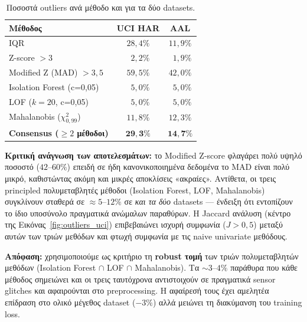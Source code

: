 \begin{table}[H]
    \centering
    \caption{Ποσοστά outliers ανά μέθοδο και για τα δύο datasets.}
    \label{tab:outlier_rates}
    \begin{tabular}{lcc}
        \toprule
        \textbf{Μέθοδος} & \textbf{UCI HAR} & \textbf{AAL} \\
        \midrule
        IQR                         & $28{,}4\%$ & $11{,}9\%$ \\
        Z-score $>3$                & $\phantom{0}2{,}2\%$ & $\phantom{0}1{,}9\%$ \\
        Modified Z (MAD) $>3{,}5$   & $59{,}5\%$ & $42{,}0\%$ \\
        Isolation Forest (c=0{,}05) & $\phantom{0}5{,}0\%$ & $\phantom{0}5{,}0\%$ \\
        LOF ($k=20$, c=0{,}05)       & $\phantom{0}5{,}0\%$ & $\phantom{0}5{,}0\%$ \\
        Mahalanobis ($\chi^2_{0{,}99}$) & $11{,}8\%$ & $12{,}3\%$ \\
        \midrule
        \textbf{Consensus ($\geq 2$ μέθοδοι)} & $\mathbf{29{,}3\%}$ & $\mathbf{14{,}7\%}$ \\
        \bottomrule
    \end{tabular}
\end{table}

\textbf{Κριτική ανάγνωση των αποτελεσμάτων:} το Modified Z-score
φλαγάρει πολύ υψηλό ποσοστό ($42$–$60\%$) επειδή σε ήδη
κανονικοποιημένα δεδομένα το MAD είναι πολύ μικρό, καθιστώντας
ακόμη και μικρές αποκλίσεις «ακραίες». Αντίθετα, οι τρεις
principled πολυμεταβλητές μέθοδοι (Isolation Forest, LOF,
Mahalanobis) συγκλίνουν σταθερά σε $\approx 5$–$12\%$ σε
\textit{και τα δύο} datasets — ένδειξη ότι εντοπίζουν το ίδιο
υποσύνολο πραγματικά ανώμαλων παραθύρων. Η Jaccard ανάλυση
(κέντρο της Εικόνας~\ref{fig:outliers_uci}) επιβεβαιώνει ισχυρή
συμφωνία ($J > 0{,}5$) μεταξύ αυτών των τριών μεθόδων και φτωχή
συμφωνία με τις naive univariate μεθόδους.

\textbf{Απόφαση:} χρησιμοποιούμε ως κριτήριο τη \textbf{robust
τομή} των τριών πολυμεταβλητών μεθόδων (Isolation Forest
$\cap$ LOF $\cap$ Mahalanobis). Τα $\sim 3$–$4\%$ παράθυρα που
κάθε μέθοδος σημειώνει και οι τρεις ταυτόχρονα αντιστοιχούν σε
πραγματικά sensor glitches και αφαιρούνται στο preprocessing.
Η αφαίρεσή τους έχει αμελητέα επίδραση στο ολικό μέγεθος
dataset ($-3\%$) αλλά μειώνει τη διακύμανση του training loss.

